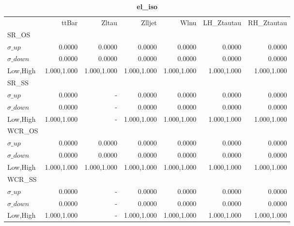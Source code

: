 \documentclass[11pt,oneside,a4paper]{article}
\begin{document}
\begin{table}
\caption{\bf{el\_iso}}
\centering
\begin{tabular}{lrrrrrr}
& ttBar & Zltau & Zlljet & Wlnu & LH\_Ztautau & RH\_Ztautau \\

SR\_OS &  &  &  &  &  &  \\
$\sigma\_up$ & 0.0000 & 0.0000 & 0.0000 & 0.0000 & 0.0000 & 0.0000 \\
$\sigma\_down$ & 0.0000 & 0.0000 & 0.0000 & 0.0000 & 0.0000 & 0.0000 \\
Low,High & 1.000,1.000 & 1.000,1.000 & 1.000,1.000 & 1.000,1.000 & 1.000,1.000 & 1.000,1.000 \\

\hline
SR\_SS &  &  &  &  &  &  \\
$\sigma\_up$ & 0.0000 & - & 0.0000 & 0.0000 & 0.0000 & 0.0000 \\
$\sigma\_down$ & 0.0000 & - & 0.0000 & 0.0000 & 0.0000 & 0.0000 \\
Low,High & 1.000,1.000 & - & 1.000,1.000 & 1.000,1.000 & 1.000,1.000 & 1.000,1.000 \\

\hline
WCR\_OS &  &  &  &  &  &  \\
$\sigma\_up$ & 0.0000 & 0.0000 & 0.0000 & 0.0000 & 0.0000 & 0.0000 \\
$\sigma\_down$ & 0.0000 & 0.0000 & 0.0000 & 0.0000 & 0.0000 & 0.0000 \\
Low,High & 1.000,1.000 & 1.000,1.000 & 1.000,1.000 & 1.000,1.000 & 1.000,1.000 & 1.000,1.000 \\

\hline
WCR\_SS &  &  &  &  &  &  \\
$\sigma\_up$ & 0.0000 & - & 0.0000 & 0.0000 & 0.0000 & 0.0000 \\
$\sigma\_down$ & 0.0000 & - & 0.0000 & 0.0000 & 0.0000 & 0.0000 \\
Low,High & 1.000,1.000 & - & 1.000,1.000 & 1.000,1.000 & 1.000,1.000 & 1.000,1.000 \\
\end{tabular}
\end{table}
\end{document}
